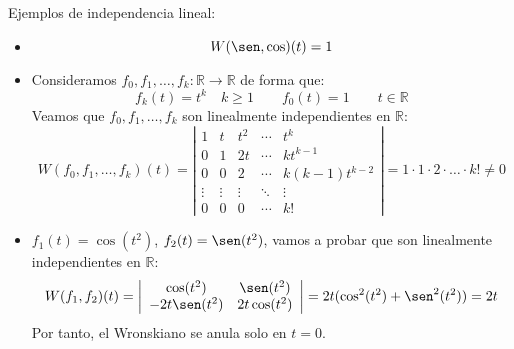 \begin{ejemplo}
    Ejemplos de independencia lineal:
    \begin{itemize}
        \item 
            \begin{equation*}
                W(\sen, \cos)(t) = 1
            \end{equation*}
        \item Consideramos $f_0,f_1,\ldots,f_k:\mathbb{R}\rightarrow\mathbb{R}$ de forma que:
            \begin{equation*}
                f_k(t) = t^k \quad k\geq 1 \qquad f_0(t) = 1 \qquad t\in \mathbb{R}
            \end{equation*}
            Veamos que $f_0,f_1,\ldots,f_k$ son linealmente independientes en $\mathbb{R}$:
            \begin{equation*}
                W(f_0,f_1,\ldots,f_k)(t) = \left|\begin{array}{ccccl}
                    1 & t & t^2 & \cdots & t^k \\
                    0 & 1 & 2t & \cdots & kt^{k-1} \\
                    0 & 0 & 2 & \cdots & k(k-1)t^{k-2} \\
                    \vdots & \vdots & \vdots & \ddots & \vdots \\
                    0 & 0 & 0 & \cdots & k!
                \end{array}\right| = 1\cdot 1\cdot 2\cdot \ldots \cdot k! \neq 0
            \end{equation*}
        \item $f_1(t) = \cos(t^2)$, $f_2(t) = \sen(t^2)$, vamos a probar que son linealmente independientes en $\mathbb{R}$:
            \begin{equation*}
                W(f_1,f_2)(t) = \left|\begin{array}{cc}
                    \cos(t^2) & \sen(t^2) \\
                    -2t\sen(t^2) & 2t\cos(t^2) 
                \end{array}\right| = 2t (\cos^2(t^2) + \sen^2(t^2))= 2t
            \end{equation*}
            Por tanto, el Wronskiano se anula solo en $t=0$.


\end{itemize}
\end{ejemplo}
